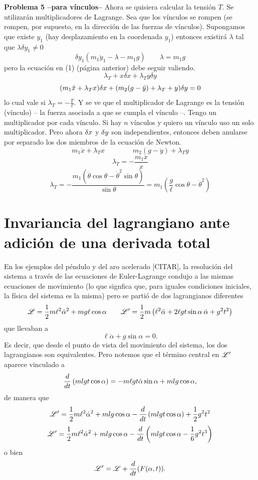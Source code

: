 \documentclass[10pt,oneside]{CBFT_book}
\begin{document}
\begin{ejemplo}{\bf Problema 5 --para vínculos--}
Ahora se quisiera calcular la tensión $T$. Se utilizarán multiplicadores de Lagrange. Sea que los vínculos se rompen (se rompen, por supuesto, en la 
dirección de las fuerzas de vínculos). Supongamos que existe $y_1$ (hay desplazamiento en la coordenada $y_1$) entonces existirá $\lambda$ tal que 
$\lambda  \delta y_1 \neq 0$
\[
	\delta y_1 ( m_1 \ddot{y}_1 - \lambda - m_1 g ) \qquad \lambda = m_1 g
\]
pero la ecuación en (1) (página anterior) debe seguir valiendo.
\[
	\lambda_T + x \delta x + \lambda_T y \delta y 
\]
\[
	( m_1 \ddot{x} + \lambda_T x ) \delta x + ( m_2 (g - \ddot{y} ) + \lambda_T + y ) \delta y = 0
\]
lo cual vale si $\lambda_T = - \frac T \ell $.
Y se ve que el multiplicador de Lagrange es la tensión (vínculo) -- la fuerza asociada a que se cumpla el vínculo --.
Tengo un multiplicador por cada vínculo. Si hay $n$ vínculos y quiero un vínculo uso un solo multiplicador.
Pero ahora $\delta x$ y $\delta y$ son independientes, entonces deben anularse por separado los dos miembros de la ecuación de Newton.
\[
	m_1 \ddot{x} + \lambda_T x  \qquad \qquad m_ 2(g -\ddot{y}) + \lambda_T y
\]
\[
	\lambda_T = - \frac{m_1 \ddot{x}}{x} 
\]
\[
	\lambda_T = -\frac{ m_1 ( \ddot{ \theta } \cos \theta - \dot{\theta}^2 \sin \theta ) }{\sin \theta} =
	m_1 (\frac g \ell \cos \theta - \dot{\theta}^2 )
\]
\end{ejemplo}



\section{Invariancia del lagrangiano ante adición de una derivada total}

En los ejemplos del péndulo y del aro acelerado [CITAR], la resolución del sistema a través de las ecuaciones de 
Euler-Lagrange condujo a las mismas ecuaciones de movimiento (lo que signfica que, para iguales condiciones iniciales, 
la física del sistema es la misma) pero se partió de dos lagrangianos diferentes
\[
	\mathscr{L} = \frac 1 2 m \ell^2 \dot{\alpha}^2 + m g \ell \cos \alpha \qquad
	\mathscr{L}'= \frac 1 2 m \left( \ell^2 \ddot{\alpha} + 2 \ell g t \sin \alpha \: \dot{\alpha} + g^2 t^2 \right)
\]
que llevaban a
\[
	\ell \ddot{\alpha} + g \sin \alpha = 0. 
\]
Es decir, que desde el punto de vista del movimiento del sistema, los dos lagrangianos son equivalentes.
Pero notemos que el término central en $\mathscr{L}'$ aparece vinculado a 
\[
	\frac{d^{\hspace{-0.05em}} {}}{d {t}^{\hspace{-0.05em}}}\left( m l g t \cos \alpha \right) = -m \ell g t \dot{\alpha} \sin \alpha + m l g \cos \alpha,
\]
de manera que 
\[
	\mathscr{L}'= \frac 1 2 m \ell^2 \dot{\alpha}^2 + m l g \cos \alpha -
	\frac{d^{\hspace{-0.05em}} {}}{d {t}^{\hspace{-0.05em}}}\left( m l g t \cos \alpha \right) + \frac 1 2 g^2 t^2
\]
\[
	\mathscr{L}'= \frac 1 2 m \ell^2 \dot{\alpha}^2 + m l g \cos \alpha - 
	\frac{d^{\hspace{-0.05em}} {}}{d {t}^{\hspace{-0.05em}}}\left( m l g t \cos \alpha - \frac 1 6 g^2 t^3 \right)
\]
o bien 
\[
	\mathscr{L}' = \mathscr{L} + \frac{d^{\hspace{-0.05em}} {}}{d {t}^{\hspace{-0.05em}}}(F(\alpha,t)).
\]
\end{document}
